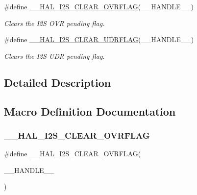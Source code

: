 \begin{DoxyCompactItemize}
\#define \hyperlink{group___i2_s___exported__macros_gabe5bab581b9d997faeb0132672376444}{\+\_\+\+\_\+\+H\+A\+L\+\_\+\+I2\+S\+\_\+\+C\+L\+E\+A\+R\+\_\+\+O\+V\+R\+F\+L\+AG}(\+\_\+\+\_\+\+H\+A\+N\+D\+L\+E\+\_\+\+\_\+)
\begin{DoxyCompactList}\small\item\em Clears the I2S O\+VR pending flag. \end{DoxyCompactList}\item 
\#define \hyperlink{group___i2_s___exported__macros_gafc275594559c5c1e26c23f3246260937}{\+\_\+\+\_\+\+H\+A\+L\+\_\+\+I2\+S\+\_\+\+C\+L\+E\+A\+R\+\_\+\+U\+D\+R\+F\+L\+AG}(\+\_\+\+\_\+\+H\+A\+N\+D\+L\+E\+\_\+\+\_\+)
\begin{DoxyCompactList}\small\item\em Clears the I2S U\+DR pending flag. \end{DoxyCompactList}\end{DoxyCompactItemize}


\subsection{Detailed Description}


\subsection{Macro Definition Documentation}
\mbox{\label{group___i2_s___exported__macros_gabe5bab581b9d997faeb0132672376444}} 
\subsubsection{\texorpdfstring{\+\_\+\+\_\+\+H\+A\+L\+\_\+\+I2\+S\+\_\+\+C\+L\+E\+A\+R\+\_\+\+O\+V\+R\+F\+L\+AG}{\_\_HAL\_I2S\_CLEAR\_OVRFLAG}}
{\footnotesize\ttfamily \#define \+\_\+\+\_\+\+H\+A\+L\+\_\+\+I2\+S\+\_\+\+C\+L\+E\+A\+R\+\_\+\+O\+V\+R\+F\+L\+AG(\begin{DoxyParamCaption}\item[{}]{\+\_\+\+\_\+\+H\+A\+N\+D\+L\+E\+\_\+\+\_\+ }\end{DoxyParamCaption})}

